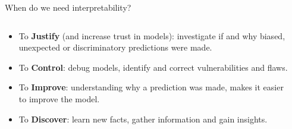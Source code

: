 \documentclass[11pt,compress,t,notes=noshow, xcolor=table]{beamer}
\begin{document}
\begin{vbframe}{When do we need interpretability?}
\begin{columns}
\begin{column}{0.6\textwidth}
\begin{itemize}
  \item To \textbf{Justify} (and increase trust in models): investigate if and why biased, unexpected or discriminatory predictions were made.
  \item To \textbf{Control}: debug models, identify and correct vulnerabilities and flaws.
  \item To \textbf{Improve}: understanding why a prediction was made, makes it easier to improve the model.
  \item To \textbf{Discover}: learn new facts, gather information and gain insights.
\end{itemize}
\end{column}
\begin{column}{0.4\textwidth}  %
 \vspace{0.5cm}
 \begin{center}
 

\end{center}
\end{column}
\end{columns}
\end{vbframe}
\end{document}
